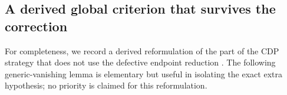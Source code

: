 \subsection{A derived global criterion that survives the correction}

For completeness, we record a derived reformulation of the part of the CDP
strategy that does not use the defective endpoint reduction
\cite[Prop.~2.4]{CDP2020}.  The following generic-vanishing lemma is
elementary but useful in isolating the exact extra hypothesis; no priority is
claimed for this reformulation.

